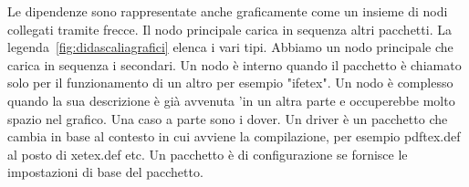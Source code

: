 Le dipendenze sono rappresentate anche graficamente come un insieme di nodi  
collegati tramite frecce. Il nodo principale  carica in sequenza altri pacchetti. La legenda~\vref{fig:didascaliagrafici} elenca i vari tipi. Abbiamo un nodo principale che carica  in sequenza i secondari. Un nodo è interno quando il pacchetto è chiamato solo per il funzionamento di un altro per esempio "ifetex". Un nodo è complesso quando la sua descrizione è già avvenuta 'in un altra parte e occuperebbe molto spazio nel grafico. Una caso a parte sono i dover. Un driver è un pacchetto che cambia in base al contesto in cui avviene la compilazione, per esempio pdftex.def al posto di xetex.def  etc.  Un pacchetto è di configurazione se fornisce le impostazioni di base del pacchetto.  